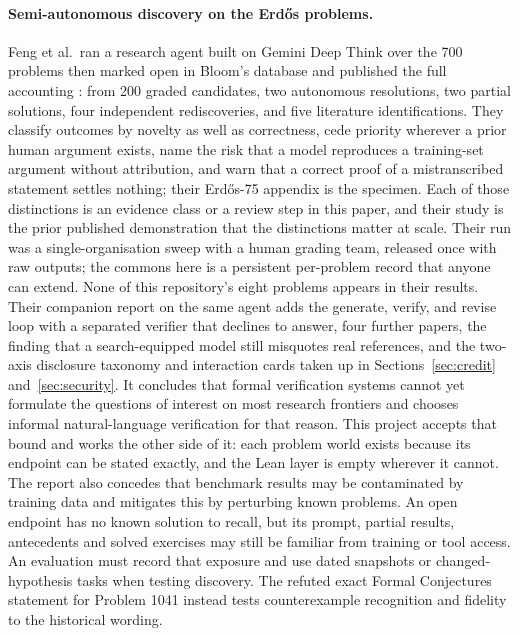 \documentclass[10pt]{article}
\begin{document}
\paragraph{Semi-autonomous discovery on the Erd\H{o}s problems.}
Feng et al.\ ran a research agent built on Gemini Deep Think over the 700
problems then marked open in Bloom's database and published the full
accounting \cite{aletheia}: from 200 graded candidates, two autonomous
resolutions, two partial solutions, four independent rediscoveries, and five
literature identifications.  They classify outcomes by novelty as well as
correctness, cede priority wherever a prior human argument exists, name the
risk that a model reproduces a training-set argument without attribution, and
warn that a correct proof of a mistranscribed statement settles nothing;
their Erd\H{o}s-75 appendix is the specimen.  Each of those distinctions is
an evidence class or a review step in this paper, and their study is the
prior published demonstration that the distinctions matter at scale.  Their
run was a single-organisation sweep with a human grading team, released once
with raw outputs; the commons here is a persistent per-problem record that
anyone can extend.  None of this repository's eight problems appears in their
results.  Their companion report on the same agent \cite{autonomousmath}
adds the generate, verify, and revise loop with a separated verifier that
declines to answer, four further papers, the finding that a search-equipped
model still misquotes real references, and the two-axis disclosure taxonomy
and interaction cards taken up in Sections~\ref{sec:credit}
and~\ref{sec:security}.  It concludes that formal verification systems
cannot yet formulate the questions of interest on most research frontiers
and chooses informal natural-language verification for that reason.  This
project accepts that bound and works the other side of it: each problem
world exists because its endpoint can be stated exactly, and the Lean layer
is empty wherever it cannot.  The report also concedes that benchmark
results may be contaminated by training data and mitigates this by
perturbing known problems. An open endpoint has no known solution to recall,
but its prompt, partial results, antecedents and solved exercises may still be
familiar from training or tool access. An evaluation must record that exposure
and use dated snapshots or changed-hypothesis tasks when testing discovery.
The refuted exact Formal Conjectures statement for Problem 1041 instead tests
counterexample recognition and fidelity to the historical wording.
\end{document}
